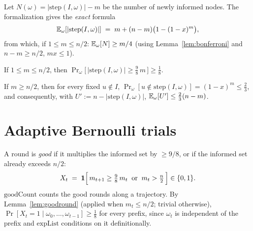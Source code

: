 \begin{lemma}\label{lem:expgrowth}
  \leanok
  Let $N(\omega) = |\mathrm{step}(I,\omega)| - m$ be the number of newly
  informed nodes. The formalization gives the \emph{exact} formula
  \[
    \mathbb{E}_\omega[|\mathrm{step}(I,\omega)|] \;=\;
      m + (n-m)\bigl(1-(1-x)^m\bigr),
  \]
  from which, if $1 \le m \le n/2$: $\mathbb{E}_\omega[N] \ge m/4$ (using
  Lemma~\ref{lem:bonferroni} and $n - m \ge n/2$, $mx \le 1$).
\end{lemma}

\begin{lemma}\label{lem:goodround}
  \leanok
  If $1 \le m \le n/2$, then
  $\Pr_\omega\bigl[\,|\mathrm{step}(I,\omega)| \ge \tfrac{9}{8}\,m\,\bigr]
    \ge \tfrac18$.
\end{lemma}

\begin{lemma}\label{lem:contract}
  \leanok
  If $m \ge n/2$, then for every fixed $u \notin I$,
  $\Pr_\omega[u \notin \mathrm{step}(I,\omega)] = (1-x)^m \le \tfrac23$, and
  consequently, with $U' := n - |\mathrm{step}(I,\omega)|$,
  $\mathbb{E}_\omega[U'] \le \tfrac23(n-m)$.
\end{lemma}

\section{Adaptive Bernoulli trials}\label{sec:adaptive}

\begin{definition}\label{def:good}
  \leanok
  A round is \emph{good} if it multiplies the informed set by $\ge 9/8$, or
  if the informed set already exceeds $n/2$:
  \[
    X_t \;=\; \mathbf{1}\Bigl[\, m_{t+1} \ge \tfrac98\, m_t
    \;\;\text{or}\;\; m_t > \tfrac n2 \,\Bigr] \in \{0,1\}.
  \]
  $\mathrm{goodCount}$ counts the good rounds along a trajectory. By
  Lemma~\ref{lem:goodround} (applied when $m_t \le n/2$; trivial otherwise),
  $\Pr[X_t = 1 \mid \omega_0,\dots,\omega_{t-1}] \ge \tfrac18$ for every
  prefix, since $\omega_t$ is independent of the prefix and
  $\mathrm{expList}$ conditions on it definitionally.
\end{definition}

